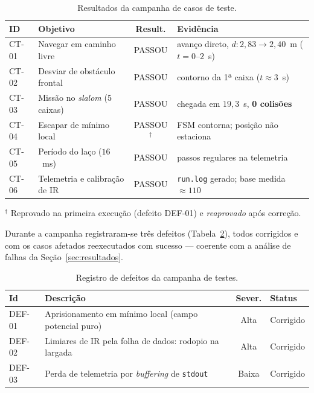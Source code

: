 \documentclass[11pt,a4paper]{article}
\begin{document}
\begin{table}[H]
\centering
\caption{Resultados da campanha de casos de teste.}
\label{tab:ct}
\renewcommand{\arraystretch}{1.15}
\begin{tabular}{@{}llcl@{}}
\toprule
\textbf{ID} & \textbf{Objetivo} & \textbf{Result.} & \textbf{Evidência} \\
\midrule
CT-01 & Navegar em caminho livre & PASSOU & avanço direto, $d:2{,}83\to2{,}40$~m ($t{=}0$--$2$~s) \\
CT-02 & Desviar de obstáculo frontal & PASSOU & contorno da 1ª caixa ($t\approx3$~s) \\
CT-03 & Missão no \emph{slalom} (5 caixas) & PASSOU & chegada em $19{,}3$~s, \textbf{0 colisões} \\
CT-04 & Escapar de mínimo local & PASSOU$^\dagger$ & FSM contorna; posição não estaciona \\
CT-05 & Período do laço ($16$~ms) & PASSOU & passos regulares na telemetria \\
CT-06 & Telemetria e calibração de IR & PASSOU & \texttt{run.log} gerado; base medida $\approx110$ \\
\bottomrule
\end{tabular}

\smallskip
{\footnotesize $^\dagger$ Reprovado na primeira execução (defeito DEF-01) e \emph{reaprovado} após correção.}
\end{table}

Durante a campanha registraram-se três defeitos (Tabela~\ref{tab:def}), todos corrigidos e com os casos afetados reexecutados com sucesso --- coerente com a análise de falhas da Seção~\ref{sec:resultados}.

\begin{table}[H]
\centering
\caption{Registro de defeitos da campanha de testes.}
\label{tab:def}
\renewcommand{\arraystretch}{1.15}
\begin{tabular}{@{}llcl@{}}
\toprule
\textbf{Id} & \textbf{Descrição} & \textbf{Sever.} & \textbf{Status} \\
\midrule
DEF-01 & Aprisionamento em mínimo local (campo potencial puro) & Alta & Corrigido \\
DEF-02 & Limiares de IR pela folha de dados: rodopio na largada & Alta & Corrigido \\
DEF-03 & Perda de telemetria por \emph{buffering} de \texttt{stdout} & Baixa & Corrigido \\
\bottomrule
\end{tabular}
\end{table}
\end{document}
